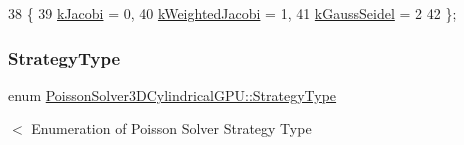 \begin{DoxyCode}
38                  \{
39     \hyperlink{classPoissonSolver3DCylindricalGPU_a2477dcc6ced1975ec64f20136f8b8499ac8aa88956983b837547940c043acc338}{kJacobi} = 0,      
40     \hyperlink{classPoissonSolver3DCylindricalGPU_a2477dcc6ced1975ec64f20136f8b8499a6cfc0a8bf688cea321bfb31bc5ffb5f6}{kWeightedJacobi} = 1, 
41     \hyperlink{classPoissonSolver3DCylindricalGPU_a2477dcc6ced1975ec64f20136f8b8499a4e13ece57b52474aadbfdf204f624e80}{kGaussSeidel} = 2  
42   \};
\end{DoxyCode}
\hypertarget{classPoissonSolver3DCylindricalGPU_a5358c19436c2d27d2b917d070273e180}{}\label{classPoissonSolver3DCylindricalGPU_a5358c19436c2d27d2b917d070273e180} 
\subsubsection{\texorpdfstring{Strategy\+Type}{StrategyType}}
{\footnotesize\ttfamily enum \hyperlink{classPoissonSolver3DCylindricalGPU_a5358c19436c2d27d2b917d070273e180}{Poisson\+Solver3\+D\+Cylindrical\+G\+P\+U\+::\+Strategy\+Type}}



$<$ Enumeration of Poisson Solver Strategy Type 


